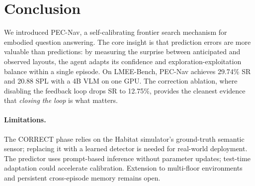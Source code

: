 \section{Conclusion}

We introduced PEC-Nav, a self-calibrating frontier search mechanism for embodied question answering. The core insight is that prediction errors are more valuable than predictions: by measuring the surprise between anticipated and observed layouts, the agent adapts its confidence and exploration-exploitation balance within a single episode. On LMEE-Bench, PEC-Nav achieves 29.74\% SR and 20.88 SPL with a 4B VLM on one GPU. The correction ablation, where disabling the feedback loop drops SR to 12.75\%, provides the cleanest evidence that \emph{closing the loop} is what matters.

\paragraph{Limitations.} The CORRECT phase relies on the Habitat simulator's ground-truth semantic sensor; replacing it with a learned detector is needed for real-world deployment. The predictor uses prompt-based inference without parameter updates; test-time adaptation could accelerate calibration. Extension to multi-floor environments and persistent cross-episode memory remains open.
